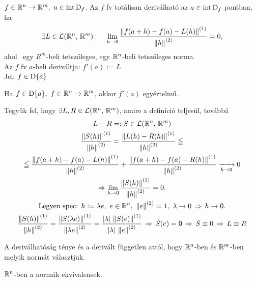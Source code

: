 \begin{de}
  $f\in\mathbb{R}^n\to\mathbb{R}^m,\ a\in\operatorname{int\,D}_f$. Az $f$ fv totálisan deriválható az $a\in\operatorname{int\,D}_f$ pontban, ha
  \[\exists L\in\mathcal{L}(\mathbb{R}^n,\,\mathbb{R}^m)\colon\quad \lim_{h\to\mathsf{0}}\dfrac{\left\Vert f(a+h)-f(a)-L(h)\right\Vert^{(1)}}{\left\Vert h\right\Vert^{(2)}} = 0,\]
  ahol \ egy $R^m$-beli tetszőleges,  egy $\mathbb{R}^n$-beli tetszőleges norma.\\
  Az $f$ fv $a$-beli deriváltja: $f'(a) := L$\\
  Jel: $f\in\operatorname{D}\{a\}$
\end{de}

\begin{te}
  Ha $f\in\operatorname{D}\{a\},\ f\in\mathbb{R}^n\to\mathbb{R}^m$, akkor $f'(a)$ egyértelmű.
\end{te}

\begin{biz}
  Tegyük fel, hogy $\exists L,R\in\mathcal{L}(\mathbb{R}^n,\,\mathbb{R}^m)$, amire a definíció teljesül, továbbá 
  \begin{gather*}
     L-R=:S\in\mathcal{L}(\mathbb{R}^n,\,\mathbb{R}^m)\\
     \dfrac{\left\Vert S(h)\right\Vert^{(1)}}{\left\Vert h\right\Vert^{(2)}} = \dfrac{\left\Vert L(h)-R(h)\right\Vert^{(1)}}{\left\Vert h\right\Vert^{(2)}} \leqq\\
     \leqq\dfrac{\left\Vert f(a+h)-f(a)-L(h)\right\Vert^{(1)}}{\left\Vert h\right\Vert^{(2)}} + \dfrac{\left\Vert f(a+h)-f(a)-R(h)\right\Vert^{(1)}}{\left\Vert h\right\Vert^{(2)}} \xrightarrow
     [h\to\mathsf{0}]{}0\\
     \Rightarrow \lim_{h\to\mathsf{0}} \dfrac{\left\Vert S(h)\right\Vert^{(1)}}{\left\Vert h\right\Vert^{(2)}} = 0.\\\text{Legyen spec: }h:=\lambda e,\
     e\in\mathbb{R}^n,\ \left\Vert e\right\Vert^{(2)} = 1,\ \lambda \to 0\, \Rightarrow\, h\to\mathsf{0}. \\
     \dfrac{\left\Vert S(h)\right\Vert^{(1)}}{\left\Vert h\right\Vert^{(2)}} = \dfrac{\left\Vert S(\lambda e)\right\Vert^{(1)}}{\left\Vert \lambda e \right\Vert^{(2)}} =
     \dfrac{|\lambda|\,\left\Vert S(e)\right\Vert^{(1)}}{|\lambda|\,\left\Vert e\right\Vert^{(2)}}\, \Rightarrow\, S(e) = \mathsf{0} \,\Rightarrow\, S \equiv 0 \,\Rightarrow\, L
     \equiv R
  \end{gather*}
\end{biz}

\begin{te}
  A deriválhatóság ténye és a derivált független attól, hogy $\mathbb{R}^n$-ben és $\mathbb{R}^m$-ben melyik normát választjuk.
\end{te}
\begin{biz}
  $\mathbb{R}^n$-ben a normák ekvivalensek.
\end{biz}

